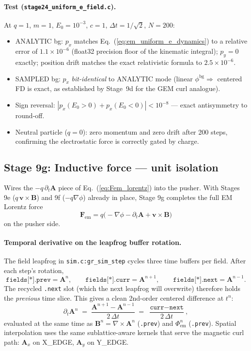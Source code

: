 \documentclass[11pt,a4paper]{article}
\newcommand{\vv}[1]{\mathbf{#1}}
\begin{document}
\paragraph{Test (\texttt{stage24\_uniform\_e\_field.c}).}  At $q = 1$,
$m = 1$, $E_0 = 10^{-3}$, $c = 1$, $\Delta t = 1/\sqrt{2}$, $N = 200$:
\begin{itemize}
  \item ANALYTIC bg:  $p_x$ matches Eq.~(\ref{eq:em_uniform_e_dynamics})
    to a relative error of $1.1\times 10^{-6}$ (float32 precision floor
    of the kinematic integral); $p_y = 0$ exactly; position drift
    matches the exact relativistic formula to $2.5\times 10^{-6}$.
  \item SAMPLED bg:  $p_x$ \emph{bit-identical} to ANALYTIC mode (linear
    $\phi^{\mathrm{bg}} \Rightarrow$ centered FD is exact, as established
    by Stage~9d for the GEM curl analogue).
  \item Sign reversal: $|p_x(E_0 > 0) + p_x(E_0 < 0)| < 10^{-8}$ ---
    exact antisymmetry to round-off.
  \item Neutral particle ($q = 0$): zero momentum and zero drift after
    200 steps, confirming the electrostatic force is correctly gated
    by charge.
\end{itemize}

\subsection{Stage 9g: Inductive force --- unit isolation}
\label{sec:stage_em_inductive}

Wires the $-q\,\partial_t\vv{A}$ piece of Eq.~(\ref{eq:Fem_lorentz})
into the pusher.  With Stages 9e ($q\,\vv{v}\!\times\!\vv{B}$) and 9f
($-q\nabla\phi$) already in place, Stage 9g completes the full EM
Lorentz force
\begin{equation*}
  \vv{F}_{\mathrm{em}} = q\bigl(-\nabla\phi - \partial_t\vv{A} + \vv{v}\!\times\!\vv{B}\bigr)
\end{equation*}
on the pusher side.

\paragraph{Temporal derivative on the leapfrog buffer rotation.}  The
field leapfrog in \texttt{sim.c:gr\_sim\_step} cycles three time
buffers per field.  After each step's rotation,
\[
  \texttt{fields[*].prev} = \vv{A}^n,\qquad
  \texttt{fields[*].curr} = \vv{A}^{n+1},\qquad
  \texttt{fields[*].next} = \vv{A}^{n-1}.
\]
The recycled \texttt{.next} slot (which the next leapfrog will overwrite)
therefore holds the \emph{previous} time slice.  This gives a clean
2nd-order centered difference at $t^n$:
\begin{equation}
\label{eq:dt_A_centered}
  \partial_t\vv{A}^n
   \;=\; \frac{\vv{A}^{n+1} - \vv{A}^{n-1}}{2\,\Delta t}
   \;=\; \frac{\texttt{curr} - \texttt{next}}{2\,\Delta t},
\end{equation}
evaluated at the same time as $\vv{B}^n = \nabla\!\times\!\vv{A}^n$
(\texttt{.prev}) and $\Phi_{\mathrm{em}}^n$ (\texttt{.prev}).  Spatial
interpolation uses the same sublattice-aware kernels that serve the
magnetic curl path: $\vv{A}_x$ on X\_EDGE, $\vv{A}_y$ on Y\_EDGE.
\end{document}
